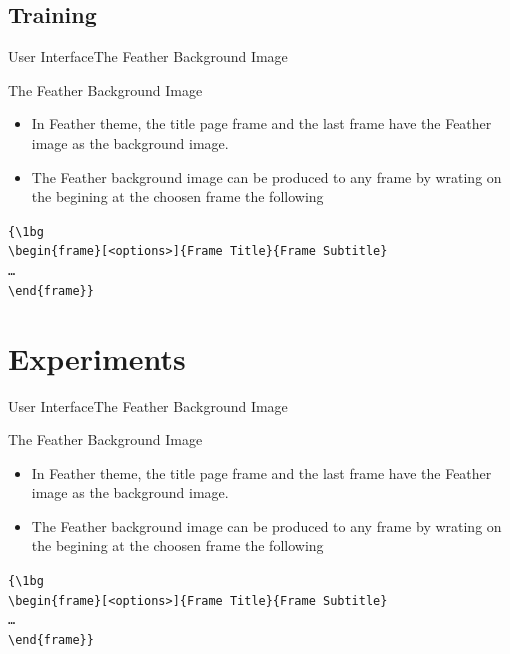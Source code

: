 \documentclass[10pt]{beamer}
\begin{document}
\subsection{Training}
\begin{frame}{User Interface}{The Feather Background Image}

\begin{block}{The Feather Background Image}
    \begin{itemize}
    \item In Feather theme, the title page frame and the last frame have the Feather image as the background image. 
    \item The Feather background image can be produced to any frame by wrating on the begining at the choosen frame the following
    \end{itemize} 
    
    \vspace{5pt} 
    
  {\tt \{\textbackslash 1bg\\
    \textbackslash begin\{frame\}[<options>]\{Frame Title\}\{Frame Subtitle\}\\
    \ldots\\
    \textbackslash end\{frame\}\}}
\end{block}
\end{frame}

\section{Experiments}
\begin{frame}{User Interface}{The Feather Background Image}

\begin{block}{The Feather Background Image}
    \begin{itemize}
    \item In Feather theme, the title page frame and the last frame have the Feather image as the background image. 
    \item The Feather background image can be produced to any frame by wrating on the begining at the choosen frame the following
    \end{itemize} 
    
    \vspace{5pt} 
    
  {\tt \{\textbackslash 1bg\\
    \textbackslash begin\{frame\}[<options>]\{Frame Title\}\{Frame Subtitle\}\\
    \ldots\\
    \textbackslash end\{frame\}\}}
\end{block}
\end{frame}
\end{document}
